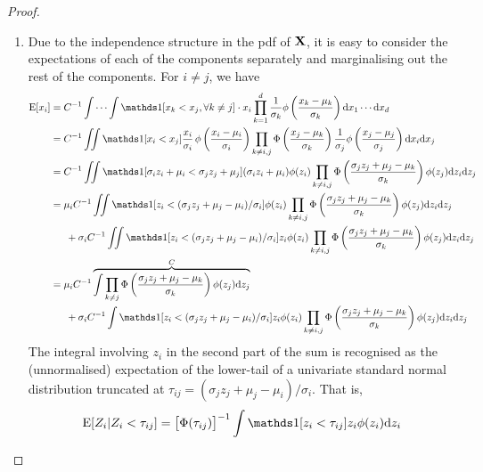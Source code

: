 \begin{proof}
\begin{enumerate}[label=(\roman*)]
  \item Due to the independence structure in the pdf of ${\mathbf X}$, it is easy to consider the expectations of each of the components separately and marginalising out the rest of the components. For $i \neq j$, we have
  \begin{align*}
    \E[x_i] 
    &= C^{-1} \idotsint \ind[x_k < x_j, \forall k \neq j] \cdot x_i  \prod_{k=1}^d \frac{1}{\sigma_k}\phi \left( \frac{x_k - \mu_k}{\sigma_k} \right) \d x_1 \cdots \d x_d \\
    &= C^{-1} \iint \ind[x_i < x_j] \frac{x_i}{\sigma_i} \, \phi \left( \frac{x_i - \mu_i}{\sigma_i} \right)  \prod_{k \neq i,j} \Phi \left( \frac{x_j - \mu_k}{\sigma_k} \right) \frac{1}{\sigma_j}\phi \left( \frac{x_j - \mu_j}{\sigma_j} \right) \d x_i \d x_j \\
    &= C^{-1} \iint \ind[\sigma_i z_i + \mu_i < \sigma_j z_j + \mu_j] (\sigma_i z_i + \mu_i) \phi (z_i)  \prod_{k \neq i,j} \Phi \left( \frac{\sigma_j z_j + \mu_j - \mu_k}{\sigma_k} \right) \phi (z_j) \d z_i \d z_j \\
    &= \mu_i C^{-1} \iint \ind[ z_i < (\sigma_j z_j + \mu_j - \mu_i) / \sigma_i] \phi (z_i)  \prod_{k \neq i,j} \Phi \left( \frac{\sigma_j z_j + \mu_j - \mu_k}{\sigma_k} \right) \phi (z_j) \d z_i \d z_j \\*    
    &\phantom{==} + \sigma_i C^{-1} \iint \ind[z_i < (\sigma_j z_j + \mu_j - \mu_i) / \sigma_i] z_i \phi (z_i)  \prod_{k \neq i,j} \Phi \left( \frac{\sigma_j z_j + \mu_j - \mu_k}{\sigma_k} \right) \phi (z_j) \d z_i \d z_j \\
    &= \mu_i C^{-1} 
    \overbrace{
    \int  \prod_{k \neq j} \Phi \left( \frac{\sigma_j z_j + \mu_j - \mu_k}{\sigma_k} \right) \phi (z_j) \d z_j
    }^{C} \\  
    &\phantom{==} + \sigma_i C^{-1} \int \ind[ z_i < (\sigma_j z_j + \mu_j - \mu_i) / \sigma_i] z_i \phi (z_i) \prod_{k \neq i,j} \Phi \left( \frac{\sigma_j z_j + \mu_j - \mu_k}{\sigma_k} \right) \phi (z_j) \d z_i \d z_j \\
  \end{align*}
  The integral involving $z_i$ in the second part of the sum is recognised as the (unnormalised) expectation of the lower-tail of a univariate standard normal distribution truncated at $\tau_{ij} = (\sigma_j z_j + \mu_j - \mu_i) / \sigma_i$. That is,
  \[
    \E[Z_i | Z_i < \tau_{ij}] 
    = \big[\Phi(\tau_{ij})\big]^{-1} \int \ind [z_i < \tau_{ij}] z_i \phi(z_i) \d z_i 
\]
\end{enumerate}
\end{proof}
